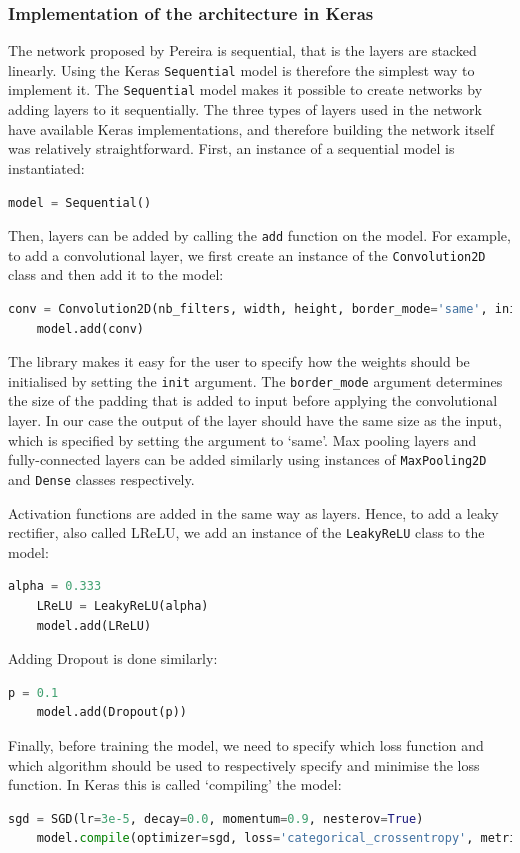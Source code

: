\documentclass[12pt,a4paper,twoside,openright]{report}
\begin{document}
\subsubsection{Implementation of the architecture in Keras}
The network proposed by Pereira is sequential, that is the layers are stacked linearly. Using the Keras \texttt{Sequential} model is therefore the simplest way to implement it. The \texttt{Sequential} model makes it possible to create networks by adding layers to it sequentially. The three types of layers used in the network have available Keras implementations, and therefore building the network itself was relatively straightforward. First, an instance of a sequential model is instantiated:
\begin{lstlisting}[language=Python]
	model = Sequential()
\end{lstlisting}
Then, layers can be added by calling the \texttt{add} function on the model. For example, to add a convolutional layer, we first create an instance of the \texttt{Convolution2D} class and then add it to the model:
\begin{lstlisting}[language=Python]
	conv = Convolution2D(nb_filters, width, height, border_mode='same', init='glorot_normal')
	model.add(conv)
\end{lstlisting}
The library makes it easy for the user to specify how the weights should be initialised by setting the \texttt{init} argument. The \texttt{border\_mode} argument determines the size of the padding that is added to input before applying the convolutional layer. In our case the output of the layer should have the same size as the input, which is specified by setting the argument to `same'. Max pooling layers and fully-connected layers can be added similarly using instances of \texttt{MaxPooling2D} and \texttt{Dense} classes respectively.

Activation functions are added in the same way as layers. Hence, to add a leaky rectifier, also called LReLU, we add an instance of the \texttt{LeakyReLU} class to the model:
\begin{lstlisting}[language=Python]
	alpha = 0.333
	LReLU = LeakyReLU(alpha)
	model.add(LReLU)
\end{lstlisting}
Adding Dropout is done similarly:
\begin{lstlisting}[language=Python]
	p = 0.1
	model.add(Dropout(p))
\end{lstlisting}

Finally, before training the model, we need to specify which loss function and which algorithm should be used to respectively specify and minimise the loss function. In Keras this is called `compiling' the model:
\begin{lstlisting}[language=Python]
	sgd = SGD(lr=3e-5, decay=0.0, momentum=0.9, nesterov=True)
	model.compile(optimizer=sgd, loss='categorical_crossentropy', metrics=['accuracy']
\end{lstlisting}
\end{document}
